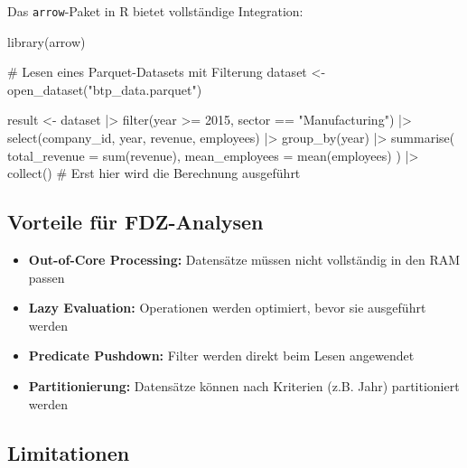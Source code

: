 \documentclass[
  ngerman,
  10pt,
  letterpaper,
  twocolumn]{book}
\newenvironment{Shaded}{\begin{snugshade}}{\end{snugshade}}
\newcommand{\AttributeTok}[1]{\textcolor[rgb]{0.40,0.45,0.13}{#1}}
\newcommand{\CommentTok}[1]{\textcolor[rgb]{0.37,0.37,0.37}{#1}}
\newcommand{\DecValTok}[1]{\textcolor[rgb]{0.68,0.00,0.00}{#1}}
\newcommand{\FunctionTok}[1]{\textcolor[rgb]{0.28,0.35,0.67}{#1}}
\newcommand{\NormalTok}[1]{\textcolor[rgb]{0.00,0.23,0.31}{#1}}
\newcommand{\OtherTok}[1]{\textcolor[rgb]{0.00,0.23,0.31}{#1}}
\newcommand{\SpecialCharTok}[1]{\textcolor[rgb]{0.37,0.37,0.37}{#1}}
\newcommand{\StringTok}[1]{\textcolor[rgb]{0.13,0.47,0.30}{#1}}
\providecommand{\tightlist}{%
  \setlength{\itemsep}{0pt}\setlength{\parskip}{0pt}}
\begin{document}
Das \texttt{arrow}-Paket in R bietet vollständige Integration:

\begin{Shaded}
\begin{Highlighting}[]
\FunctionTok{library}\NormalTok{(arrow)}

\CommentTok{\# Lesen eines Parquet{-}Datasets mit Filterung}
\NormalTok{dataset }\OtherTok{\textless{}{-}} \FunctionTok{open\_dataset}\NormalTok{(}\StringTok{"btp\_data.parquet"}\NormalTok{)}

\NormalTok{result }\OtherTok{\textless{}{-}}\NormalTok{ dataset }\SpecialCharTok{|\textgreater{}}
  \FunctionTok{filter}\NormalTok{(year }\SpecialCharTok{\textgreater{}=} \DecValTok{2015}\NormalTok{, sector }\SpecialCharTok{==} \StringTok{"Manufacturing"}\NormalTok{) }\SpecialCharTok{|\textgreater{}}
  \FunctionTok{select}\NormalTok{(company\_id, year, revenue, employees) }\SpecialCharTok{|\textgreater{}}
  \FunctionTok{group\_by}\NormalTok{(year) }\SpecialCharTok{|\textgreater{}}
  \FunctionTok{summarise}\NormalTok{(}
    \AttributeTok{total\_revenue =} \FunctionTok{sum}\NormalTok{(revenue),}
    \AttributeTok{mean\_employees =} \FunctionTok{mean}\NormalTok{(employees)}
\NormalTok{  ) }\SpecialCharTok{|\textgreater{}}
  \FunctionTok{collect}\NormalTok{()  }\CommentTok{\# Erst hier wird die Berechnung ausgeführt}
\end{Highlighting}
\end{Shaded}

\subsection{Vorteile für
FDZ-Analysen}\label{vorteile-fuxfcr-fdz-analysen}

\begin{itemize}
\tightlist
\item
  \textbf{Out-of-Core Processing:} Datensätze müssen nicht vollständig
  in den RAM passen
\item
  \textbf{Lazy Evaluation:} Operationen werden optimiert, bevor sie
  ausgeführt werden
\item
  \textbf{Predicate Pushdown:} Filter werden direkt beim Lesen
  angewendet
\item
  \textbf{Partitionierung:} Datensätze können nach Kriterien (z.B. Jahr)
  partitioniert werden
\end{itemize}

\subsection{Limitationen}\label{limitationen}
\end{document}
